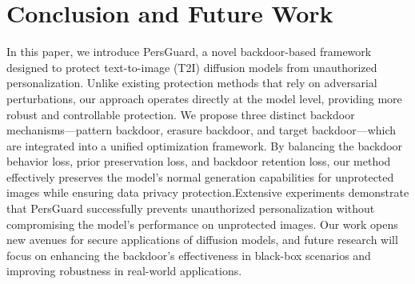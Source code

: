 \section{Conclusion and Future Work}
In this paper, we introduce PersGuard, a novel backdoor-based framework designed to protect text-to-image (T2I) diffusion models from unauthorized personalization. Unlike existing protection methods that rely on adversarial perturbations, our approach operates directly at the model level, providing more robust and controllable protection. We propose three distinct backdoor mechanisms—pattern backdoor, erasure backdoor, and target backdoor—which are integrated into a unified optimization framework. By balancing the backdoor behavior loss, prior preservation loss, and backdoor retention loss, our method effectively preserves the model's normal generation capabilities for unprotected images while ensuring data privacy protection.Extensive experiments demonstrate that PersGuard successfully prevents unauthorized personalization without compromising the model’s performance on unprotected images. Our work opens new avenues for secure applications of diffusion models, and future research will focus on enhancing the backdoor's effectiveness in black-box scenarios and improving robustness in real-world applications.